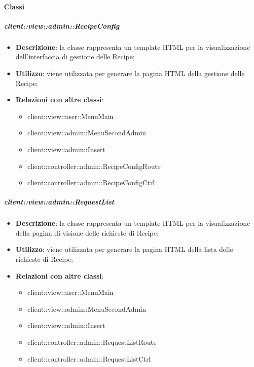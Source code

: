 	\paragraph{Classi} %
		\subparagraph{client::view::admin::RecipeConfig} %
		\label{subp:bdsm_app_client_view_admin_recipeconfig}
			\begin{itemize}
				\item \textbf{Descrizione}: la classe rappresenta un template HTML per la visualizzazione dell'interfaccia di gestione delle Recipe;
				\item \textbf{Utilizzo}: viene utilizzata per generare la pagina HTML della gestione delle Recipe;
				\item \textbf{Relazioni con altre classi}:
					\begin{itemize}
						\item client::view::user::MenuMain
						\item client::view::admin::MenuSecondAdmin
						\item client::view::admin::Insert
						\item client::controller::admin::RecipeConfigRoute
						\item client::controller::admin::RecipeConfigCtrl
					\end{itemize}
			\end{itemize}

		\subparagraph{client::view::admin::RequestList} %
		\label{subp:bdsm_app_client_view_admin_requestlist}
			\begin{itemize}
				\item \textbf{Descrizione}: la classe rappresenta un template HTML per la visualizzazione della pagina di visione delle richieste di Recipe;
				\item \textbf{Utilizzo}: viene utilizzata per generare la pagina HTML della lista delle richieste di Recipe;
				\item \textbf{Relazioni con altre classi}:
					\begin{itemize}
						\item client::view::user::MenuMain
						\item client::view::admin::MenuSecondAdmin
						\item client::view::admin::Insert
						\item client::controller::admin::RequestListRoute
						\item client::controller::admin::RequestListCtrl
					\end{itemize}
			\end{itemize}

